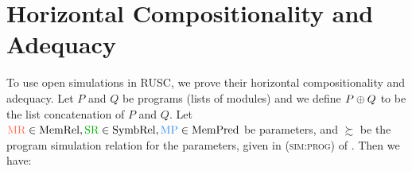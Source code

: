 {%



}

\section{Horizontal Compositionality and Adequacy}
\label{sec:main-verification:theorems}

To use open simulations in RUSC, we prove their horizontal compositionality and adequacy.  Let $P$
and $Q$ be programs (\ie lists of modules) and we define $P \oplus Q$ to be the list concatenation
of $P$ and $Q$.  Let
$\MREL \in \textrm{MemRel}, \SREL \in \textrm{SymbRel}, \MPRED \in \textrm{MemPred}$ be parameters,
and $\succsim$ be the program simulation relation for the parameters,
given in \textsc{(sim:prog)} of .  Then we have:

